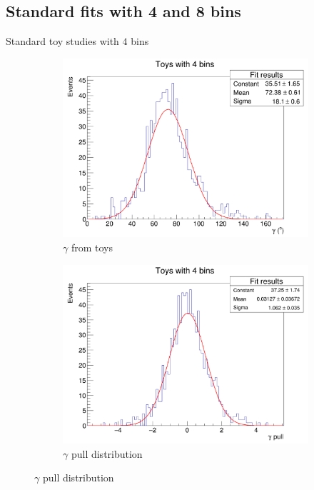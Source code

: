 \documentclass{beamer}
\begin{document}
\subsection{Standard fits with 4 and 8 bins}
\begin{frame}{Standard toy studies with $4$ bins}
  \begin{figure}
    \centering
    \vspace{-0.2cm}
    \begin{subfigure}{0.5\textwidth}
      \includegraphics[width = 1.0\textwidth]{Toy_Standard_4Bins.png}
      \caption{$\gamma$ from toys}
    \end{subfigure}%
    \begin{subfigure}{0.5\textwidth}
      \includegraphics[width = 1.0\textwidth]{Toy_Standard_4Bins_Pull.png}
      \caption{$\gamma$ pull distribution}
    \end{subfigure}
  \end{figure}
\end{frame}
\end{document}

